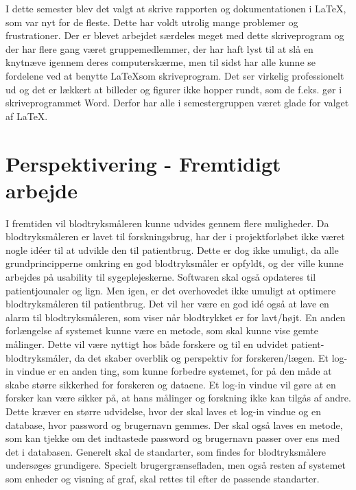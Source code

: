 I dette semester blev det valgt at skrive rapporten og dokumentationen i \LaTeX, som var nyt for de fleste. Dette har voldt utrolig mange problemer og frustrationer.  Der er blevet arbejdet særdeles meget med dette skriveprogram og der har flere gang været gruppemedlemmer, der har haft lyst til at slå en knytnæve igennem deres computerskærme, men til sidst har alle kunne se fordelene ved at benytte \LaTeX som skriveprogram. Det ser virkelig professionelt ud og det er lækkert at billeder og figurer ikke hopper rundt, som de f.eks. gør i skriveprogrammet Word. Derfor har alle i semestergruppen været glade for valget af \LaTeX. \\


\section{Perspektivering - Fremtidigt arbejde}
I fremtiden vil blodtryksmåleren kunne udvides gennem flere muligheder. Da blodtryksmåleren er lavet til forskningsbrug, har der i projektforløbet ikke været nogle idéer til at udvikle den til patientbrug. Dette er dog ikke umuligt, da alle grundprincipperne omkring en god blodtryksmåler er opfyldt, og der ville kunne arbejdes på usability til sygeplejeskerne. Softwaren skal også opdateres til patientjounaler og lign. Men igen, er det overhovedet ikke umuligt at optimere blodtryksmåleren til patientbrug. Det vil her være en god idé også at lave en alarm til blodtryksmåleren, som viser når blodtrykket er for lavt/højt. En anden forlængelse af systemet kunne være en metode, som skal kunne vise gemte målinger. Dette vil være nyttigt hos både forskere og til en udvidet patient-blodtryksmåler, da det skaber overblik og perspektiv for forskeren/lægen. \newline Et log-in vindue er en anden ting, som kunne forbedre systemet, for på den måde at skabe større sikkerhed for forskeren og dataene. Et log-in vindue vil gøre at en forsker kan være sikker på, at hans målinger og forskning ikke kan tilgås af andre. Dette kræver en større udvidelse, hvor der skal laves et log-in vindue og en database, hvor password og brugernavn gemmes. Der skal også laves en metode, som kan tjekke om det indtastede password og brugernavn passer over ens med det i databasen. 
\newline
Generelt skal de standarter, som findes for blodtryksmålere undersøges grundigere. Specielt brugergrænsefladen, men også resten af systemet som enheder og visning af graf, skal rettes til efter de passende standarter.
\newline 
